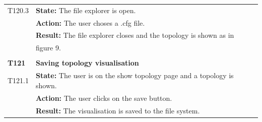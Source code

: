 \documentclass[parskip=full]{scrartcl}
\begin{document}
\begin{tabular}{p{2cm}p{11.4cm}}
T120.3 & \textbf{State:} The file explorer is open.\\
& \textbf{Action:} The user choses a .cfg file.\\
& \textbf{Result:} The file explorer closes and the topology is shown as in \\
& figure 9. \\
& \\
\textbf{T121} \hypertarget{T121}& \textbf{Saving topology visualisation}\\
T121.1 & \textbf{State:} The user is on the show topology page and a topology is shown.\\
& \textbf{Action:} The user clicks on the save button.\\
& \textbf{Result:} The visualisation is saved to the file system.\\
\end{tabular}
\newpage
\end{document}
